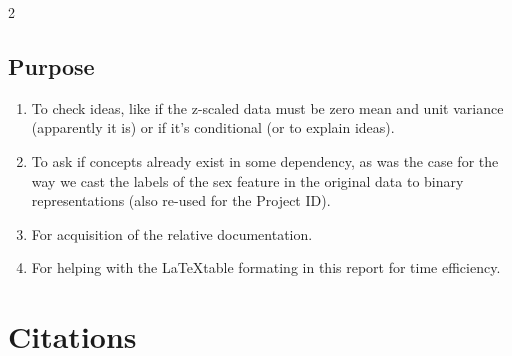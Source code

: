 \documentclass[12pt, a4paper]{article}
\begin{document}
\begin{multicols}{2}
    \subsection{Purpose} \label{subsec:llmUse}

    \begin{enumerate} \label{enm:llm}
        \item To check ideas, like if the z-scaled data must be zero mean and unit variance (apparently it is) or if it's conditional (or to explain ideas).
        \item To ask if concepts already exist in some dependency, as was the case for the way we cast the labels of the sex feature in the original data to binary representations (also re-used for the Project ID).
        \item For acquisition of the relative documentation.
        \item For helping with the \LaTeX table formating in this report for time efficiency.
    \end{enumerate}

    \section{Citations} \label{sec:citations}
\end{multicols}
\end{document}

